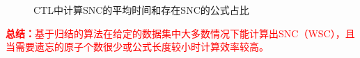 \documentclass[aspectratio=1610, 9pt, CJK]{beamer}
\begin{document}
\begin{frame}
		\begin{figure}
			\centering
			\qquad
		\caption{{\footnotesize CTL中计算SNC的平均时间和存在SNC的公式占比}}
		\end{figure}
\textcolor{red}{\textbf{总结：}基于归结的算法在给定的数据集中大多数情况下能计算出SNC（WSC），且当需要遗忘的原子个数很少或公式长度较小时计算效率较高。}
\end{frame}
\end{document}
